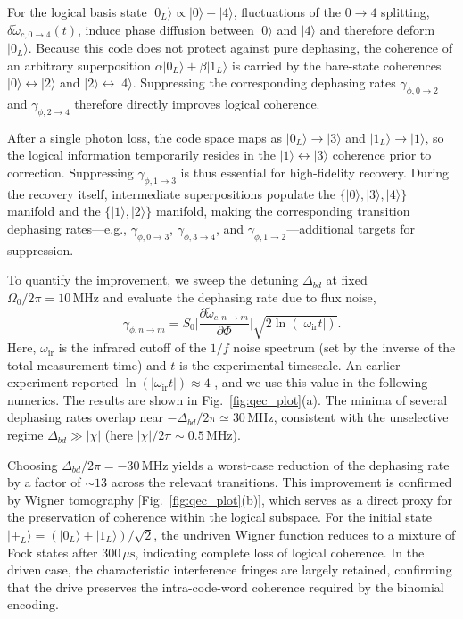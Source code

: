 For the logical basis state \( |0_L\rangle \propto |0\rangle + |4\rangle \), fluctuations of the \(0\!\rightarrow\!4\) splitting, \( \delta\widetilde{\omega}_{c,0\rightarrow 4}(t) \), induce phase diffusion between \( |0\rangle \) and \( |4\rangle \) and therefore deform \( |0_L\rangle \).
Because this code does not protect against pure dephasing, the coherence of an arbitrary superposition \( \alpha|0_L\rangle + \beta|1_L\rangle \) is carried by the bare-state coherences \( |0\rangle\!\leftrightarrow\!|2\rangle \) and \( |2\rangle\!\leftrightarrow\!|4\rangle \). Suppressing the corresponding dephasing rates \(\gamma_{\phi,0\rightarrow 2}\) and \(\gamma_{\phi,2\rightarrow 4}\) therefore directly improves logical coherence.

After a single photon loss, the code space maps as \( |0_L\rangle \rightarrow |3\rangle \) and \( |1_L\rangle \rightarrow |1\rangle \), so the logical information temporarily resides in the \( |1\rangle\!\leftrightarrow\!|3\rangle \) coherence prior to correction. Suppressing \(\gamma_{\phi,1\rightarrow 3}\) is thus essential for high-fidelity recovery. During the recovery itself, intermediate superpositions populate the \(\{|0\rangle,|3\rangle,|4\rangle\}\) manifold and the \(\{|1\rangle,|2\rangle\}\) manifold, making the corresponding transition dephasing rates---e.g., \(\gamma_{\phi,0\rightarrow 3}\), \(\gamma_{\phi,3\rightarrow 4}\), and \(\gamma_{\phi,1\rightarrow 2}\)---additional targets for suppression.

To quantify the improvement, we sweep the detuning \(\Delta_{bd}\) at fixed \(\Omega_0/2\pi = 10\,\mathrm{MHz}\) and evaluate the dephasing rate due to flux noise,
\begin{equation}
\gamma_{\phi,{n\rightarrow m}}= S_0\bigg|\frac{\partial \widetilde{\omega}_{c,n\rightarrow m}}{\partial \Phi}\bigg|\sqrt{2\ln(|\omega_\text{ir}t|)}.
\end{equation}
Here, \(\omega_\text{ir}\) is the infrared cutoff of the \(1/f\) noise spectrum (set by the inverse of the total measurement time) and \(t\) is the experimental timescale. An earlier experiment reported \(\ln(|\omega_\text{ir} t|)\approx 4\) \cite{PhysRevX.7.031037factor4}, and we use this value in the following numerics. The results are shown in Fig.~\ref{fig:qec_plot}(a). The minima of several dephasing rates overlap near \(-\Delta_{bd}/2\pi \simeq 30\,\mathrm{MHz}\), consistent with the unselective regime \(\Delta_{bd}\gg |\chi|\) (here \(|\chi|/2\pi \sim 0.5\,\mathrm{MHz}\)).

Choosing \(\Delta_{bd}/2\pi = -30\,\mathrm{MHz}\) yields a worst-case reduction of the dephasing rate by a factor of \(\sim 13\) across the relevant transitions. This improvement is confirmed by Wigner tomography [Fig.~\ref{fig:qec_plot}(b)], which serves as a direct proxy for the preservation of coherence within the logical subspace. For the initial state \(|+_L\rangle = (|0_L\rangle + |1_L\rangle)/\sqrt{2}\), the undriven Wigner function reduces to a mixture of Fock states after \(300\,\mu\mathrm{s}\), indicating complete loss of logical coherence. In the driven case, the characteristic interference fringes are largely retained, confirming that the drive preserves the intra-code-word coherence required by the binomial encoding.

